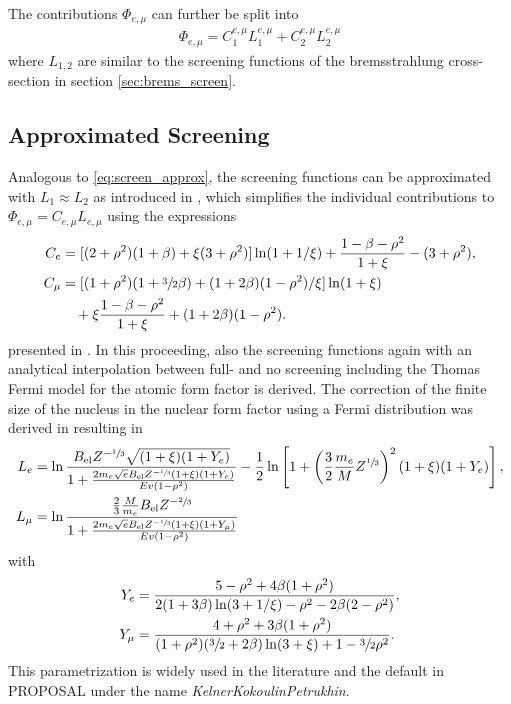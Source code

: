 The contributions $\Phi_{e,\mu}$ can further be split into
\begin{align}
    \Phi_{e,\mu} = C_1^{e,\mu} L_1^{e,\mu} + C_2^{e,\mu} L_2^{e,\mu}
\end{align}
where $L_{1,2}$ are similar to the screening functions of the bremsstrahlung cross-section in section \ref{sec:brems_screen}.

\subsection{Approximated Screening} \label{sec:epair_screen_approx}

Analogous to \eqref{eq:screen_approx}, the screening functions can be approximated with $L_1 \approx L_2$ as introduced in \cite{Kelner68Sov}, which simplifies the individual contributions to $\Phi_{e,\mu} = C_{e,\mu} L_{e,\mu}$ using the expressions
\begin{subequations} \label{eq:pair_expr_approx}
\begin{align}
    C_e &= [(2 + \rho^2)(1 + \beta) + \xi(3 + \rho^2)] \operatorname{ln}(1 + 1/\xi) + \frac{1 - \beta - \rho^2}{1 + \xi} - (3 + \rho^2) ,
    \\
    C_\mu &= [(1 + \rho^2)(1 + \sfrac{3}{2}\beta) + (1 + 2\beta)(1 - \rho^2)/\xi] \operatorname{ln}(1 + \xi) \\
    &\quad+ \xi\frac{1 - \beta - \rho^2}{1 + \xi} + (1 + 2\beta)(1 - \rho^2) . \nonumber
\end{align}
\end{subequations}
presented in \cite{Kokoulin69}.
In this proceeding, also the screening functions again with an analytical interpolation between full- and no screening including the Thomas Fermi model for the atomic form factor is derived.
The correction of the finite size of the nucleus in the nuclear form factor using a Fermi distribution was derived in \cite{Kokoulin71} resulting in
\begin{subequations} \label{eq:eqpair_approx_rad_log}
\begin{align}
    L_e &= \operatorname{ln} \frac{B_{\text{el}} Z^{-\sfrac13} \sqrt{(1 + \xi)(1 + Y_e)}}{1 + \frac{2 m_e \sqrt{e} B_{\text{el}} Z^{-\sfrac13} (1 + \xi)(1 + Y_e)}{Ev(1 - \rho^2)}}
        - \frac12 \operatorname{ln} \left[ 1 + \left( \frac32 \frac{m_e}{M} Z^{\sfrac13} \right)^2 (1 + \xi)(1 + Y_e) \right] ,
    \\
    L_\mu &= \operatorname{ln} \frac{\frac23 \frac{M}{m_e} B_{\text{el}} Z^{-\sfrac23}}{1 + \frac{2 m_e \sqrt{e} B_{\text{el}} Z^{-\sfrac13} (1 + \xi)(1 + Y_\mu)}{Ev(1 - \rho^2)}}
\end{align}
\end{subequations}
with
\begin{subequations}
\begin{align}
    Y_e &= \frac{5 - \rho^2 + 4\beta (1 + \rho^2)}{2(1 + 3\beta) \operatorname{ln}(3 + 1/\xi) - \rho^2 - 2\beta(2 - \rho^2)} ,
    \\
    Y_\mu &= \frac{4 + \rho^2 + 3\beta (1 + \rho^2)}{(1 + \rho^2)(\sfrac32 + 2\beta) \operatorname{ln}(3 + \xi) + 1 - \sfrac32 \rho^2} .
\end{align}
\end{subequations}
This parametrization is widely used in the literature and the default in PROPOSAL under the name \textit{KelnerKokoulinPetrukhin}.

